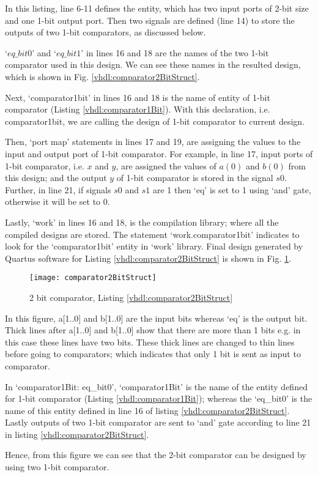 \begin{explanation}
	In this listing, line 6-11 defines the entity, which has two input ports of 2-bit size and one 1-bit output port. Then two signals are defined (line 14) to store the outputs of two 1-bit comparators, as discussed below.
	
	`$eq\_bit0$' and `$eq\_bit1$' in lines 16 and 18 are the names of the two 1-bit comparator used in this design. We can see these names in the resulted design, which is shown in Fig. \ref{vhdl:comparator2BitStruct}.  
	
	Next, `comparator1bit' in lines 16 and 18 is the name of entity of 1-bit comparator (Listing \ref{vhdl:comparator1Bit}). With this declaration, i.e. comparator1bit, we are calling the design of 1-bit comparator to current design. 
	
	Then, `port map' statements in lines 17 and 19, are assigning the values to the input and output port of 1-bit comparator. For example, in line 17, input ports of 1-bit comparator, i.e. $x$ and $y$, are assigned the values of $a(0)$ and $b(0)$ from this design; and the output $y$ of 1-bit comparator is stored in the signal $s0$. Further, in line 21, if signals $s0$ and $s1$ are 1 then `eq' is set to 1 using `and' gate, otherwise it will be set to 0.
	
	Lastly, `work' in lines 16 and 18, is the compilation library; where all the compiled designs are stored. The statement `work.comparator1bit' indicates to look for the `comparator1bit' entity in `work' library. Final design generated by Quartus software for Listing \ref{vhdl:comparator2BitStruct} is shown in Fig. \ref{fig:comparator2BitStruct}. 
\end{explanation}

\begin{figure}
	\centering
	\texttt{[image: comparator2BitStruct]}
	\caption{2 bit comparator, Listing \ref{vhdl:comparator2BitStruct}}
	\label{fig:comparator2BitStruct}
\end{figure}
\begin{explanation}
	In this figure, a[1..0] and b[1..0]  are the input bits  whereas `eq' is the output bit. Thick lines after a[1..0] and b[1..0] show that there are more than 1 bits e.g. in this case these lines have two bits. These thick lines are changed to thin lines before going to comparators; which indicates that only 1 bit is sent as input to comparator. 
	
	In `comparator1Bit: eq\_bit0', `comparator1Bit' is the name of the entity defined for 1-bit comparator (Listing \ref{vhdl:comparator1Bit}); whereas the `eq\_bit0' is the name of this entity defined in line 16 of listing \ref{vhdl:comparator2BitStruct}. Lastly outputs of two 1-bit comparator are sent to `and' gate according to line 21 in listing \ref{vhdl:comparator2BitStruct}. 
	
	Hence, from this figure we can see that the 2-bit comparator can be designed by using two 1-bit comparator. 
\end{explanation}
